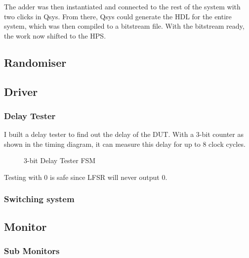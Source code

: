 The adder was then instantiated and connected to the rest of the system with
two clicks in Qsys.
From there, Qsys could generate the HDL for the entire system, which was then
compiled to a bitstream file.
With the bitstream ready, the work now shifted to the HPS.

\subsection{Randomiser}

\subsection{Driver}

\subsubsection{Delay Tester}

I built a delay tester to find out the delay of the DUT.
With a 3-bit counter as shown in the timing diagram, it can measure this delay for up to 8 clock cycles.

\begin{figure}[ht]
  \centering
  
  \caption{3-bit Delay Tester FSM}
  \label{DelayTester}
\end{figure}
Testing with 0 is safe since LFSR will never output 0.

\subsubsection{Switching system}

\subsection{Monitor}
\subsubsection{Sub Monitors}

